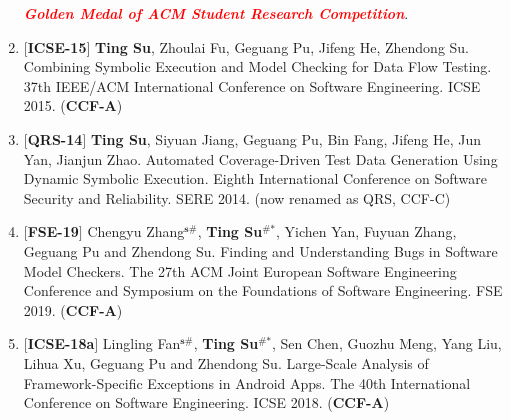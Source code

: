 \documentclass[margin]{res}
\begin{document}
\begin{resume}
\begin{enumerate}[leftmargin=*]
	\textbf{\emph{\textcolor{red}{Golden Medal of ACM Student Research Competition}}}.
	\item $[$\textbf{ICSE-15}$]$ \textbf{Ting Su}, Zhoulai Fu, Geguang Pu, Jifeng He, Zhendong Su. Combining Symbolic Execution and Model Checking for Data Flow Testing. 37th {IEEE/ACM} International Conference on Software Engineering. ICSE 2015. (\textbf{CCF-A})
	\item $[$\textbf{QRS-14}$]$ \textbf{Ting Su}, Siyuan Jiang, Geguang Pu, Bin Fang, Jifeng He, Jun Yan, Jianjun Zhao. Automated Coverage-Driven Test Data Generation Using Dynamic Symbolic Execution. Eighth International Conference on Software Security and Reliability. SERE 2014. (now renamed as QRS, CCF-C)
    \item $[$\textbf{FSE-19}$]$ Chengyu Zhang$^{\textbf{s\#}}$, \textbf{Ting Su$^{\textbf{\#*}}$}, Yichen Yan, Fuyuan Zhang, Geguang Pu and Zhendong Su. Finding and Understanding Bugs in Software Model Checkers. The 27th ACM Joint European Software Engineering Conference and Symposium on the Foundations of Software Engineering. FSE 2019. (\textbf{CCF-A})
    \item $[$\textbf{ICSE-18a}$]$ Lingling Fan$^{\textbf{s\#}}$, \textbf{Ting Su$^{\textbf{\#*}}$}, Sen Chen, Guozhu Meng, Yang Liu, Lihua Xu, Geguang Pu and Zhendong Su. Large-Scale Analysis of Framework-Specific Exceptions in Android Apps. The 40th International Conference on Software Engineering. ICSE 2018. (\textbf{CCF-A}) 
    

\end{enumerate}
\end{resume}
\end{document}
